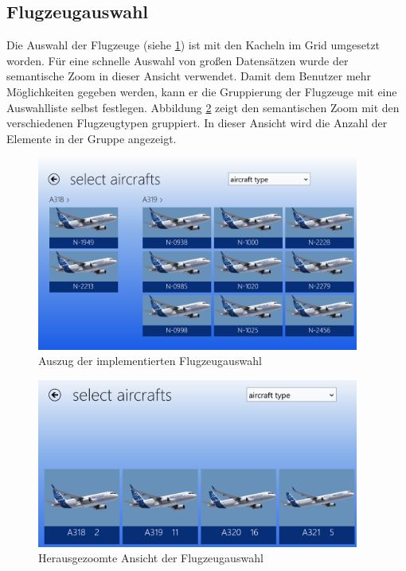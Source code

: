 \subsection{Flugzeugauswahl}
Die Auswahl der Flugzeuge (siehe \ref{aircraftSelectionImpl}) ist mit den Kacheln im Grid umgesetzt worden. Für eine schnelle Auswahl von großen Datensätzen wurde der semantische Zoom in dieser Ansicht verwendet. Damit dem Benutzer mehr Möglichkeiten gegeben werden, kann er die Gruppierung der Flugzeuge mit eine Auswahlliste selbst festlegen. Abbildung \ref{aircraftSelectionZoomImpl} zeigt den semantischen Zoom mit den verschiedenen Flugzeugtypen gruppiert.  In dieser Ansicht wird die Anzahl der Elemente in der Gruppe angezeigt. 
\begin{figure}[H]
\centering
\includegraphics[width=400px]{images/impl/select_aircrafts_impl}
\caption{Auszug der implementierten Flugzeugauswahl}
\label{aircraftSelectionImpl}
\end{figure}
\begin{figure}[H]
\centering
\includegraphics[width=400px]{images/impl/semantic_zoom_impl}
\caption{Herausgezoomte Ansicht der Flugzeugauswahl}
\label{aircraftSelectionZoomImpl}
\end{figure}

